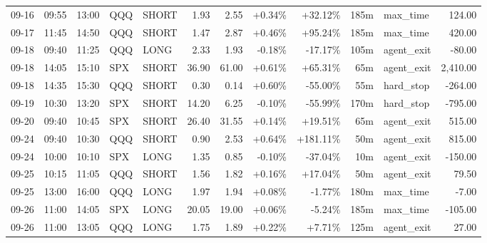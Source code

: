 \documentclass[11pt,a4paper,twoside]{article}
\begin{document}
\begin{center}
\begin{longtable}{>{\color{txtmain}}l l l l l r r r r r >{\color{txtmain}}l r}
09-16 & 09:55 & 13:00 & QQQ & SHORT & 1.93 & 2.55 & \textcolor{wingreen}{+0.34\%} & \textcolor{wingreen}{+32.12\%} & 185m & max\_time & \textcolor{wingreen}{124.00} \\
09-17 & 11:45 & 14:50 & QQQ & SHORT & 1.47 & 2.87 & \textcolor{wingreen}{+0.46\%} & \textcolor{wingreen}{+95.24\%} & 185m & max\_time & \textcolor{wingreen}{420.00} \\
09-18 & 09:40 & 11:25 & QQQ & LONG & 2.33 & 1.93 & \textcolor{lossred}{-0.18\%} & \textcolor{lossred}{-17.17\%} & 105m & agent\_exit & \textcolor{lossred}{-80.00} \\
09-18 & 14:05 & 15:10 & SPX & SHORT & 36.90 & 61.00 & \textcolor{wingreen}{+0.61\%} & \textcolor{wingreen}{+65.31\%} & 65m & agent\_exit & \textcolor{wingreen}{2,410.00} \\
09-18 & 14:35 & 15:30 & QQQ & SHORT & 0.30 & 0.14 & \textcolor{wingreen}{+0.60\%} & \textcolor{lossred}{-55.00\%} & 55m & hard\_stop & \textcolor{lossred}{-264.00} \\
09-19 & 10:30 & 13:20 & SPX & SHORT & 14.20 & 6.25 & \textcolor{lossred}{-0.10\%} & \textcolor{lossred}{-55.99\%} & 170m & hard\_stop & \textcolor{lossred}{-795.00} \\
09-20 & 09:40 & 10:45 & SPX & SHORT & 26.40 & 31.55 & \textcolor{wingreen}{+0.14\%} & \textcolor{wingreen}{+19.51\%} & 65m & agent\_exit & \textcolor{wingreen}{515.00} \\
09-24 & 09:40 & 10:30 & QQQ & SHORT & 0.90 & 2.53 & \textcolor{wingreen}{+0.64\%} & \textcolor{wingreen}{+181.11\%} & 50m & agent\_exit & \textcolor{wingreen}{815.00} \\
09-24 & 10:00 & 10:10 & SPX & LONG & 1.35 & 0.85 & \textcolor{lossred}{-0.10\%} & \textcolor{lossred}{-37.04\%} & 10m & agent\_exit & \textcolor{lossred}{-150.00} \\
09-25 & 10:15 & 11:05 & QQQ & SHORT & 1.56 & 1.82 & \textcolor{wingreen}{+0.16\%} & \textcolor{wingreen}{+17.04\%} & 50m & agent\_exit & \textcolor{wingreen}{79.50} \\
09-25 & 13:00 & 16:00 & QQQ & LONG & 1.97 & 1.94 & \textcolor{wingreen}{+0.08\%} & \textcolor{lossred}{-1.77\%} & 180m & max\_time & \textcolor{lossred}{-7.00} \\
09-26 & 11:00 & 14:05 & SPX & LONG & 20.05 & 19.00 & \textcolor{wingreen}{+0.06\%} & \textcolor{lossred}{-5.24\%} & 185m & max\_time & \textcolor{lossred}{-105.00} \\
09-26 & 11:00 & 13:05 & QQQ & LONG & 1.75 & 1.89 & \textcolor{wingreen}{+0.22\%} & \textcolor{wingreen}{+7.71\%} & 125m & agent\_exit & \textcolor{wingreen}{27.00} \\

\end{longtable}
\end{center}
\end{document}
